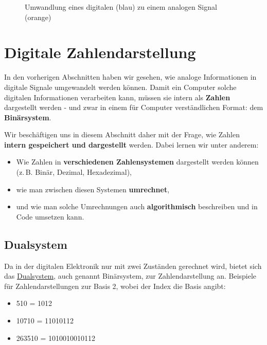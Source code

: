 \documentclass[
  letterpaper,
  DIV=11,
  numbers=noendperiod]{scrreprt}
\providecommand{\tightlist}{%
  \setlength{\itemsep}{0pt}\setlength{\parskip}{0pt}}\usepackage{longtable,booktabs,array}
\begin{document}
\begin{figure}


\caption{\label{fig-transform_digital_analog}Umwandlung eines digitalen
(blau) zu einem analogen Signal (orange)}

\end{figure}%

\section{Digitale Zahlendarstellung}\label{digitale-zahlendarstellung}

In den vorherigen Abschnitten haben wir gesehen, wie analoge
Informationen in digitale Signale umgewandelt werden können. Damit ein
Computer solche digitalen Informationen verarbeiten kann, müssen sie
intern als \textbf{Zahlen} dargestellt werden - und zwar in einem für
Computer verständlichen Format: dem \textbf{Binärsystem}.

Wir beschäftigen uns in diesem Abschnitt daher mit der Frage, wie Zahlen
\textbf{intern gespeichert und dargestellt} werden. Dabei lernen wir
unter anderem:

\begin{itemize}
\tightlist
\item
  Wie Zahlen in \textbf{verschiedenen Zahlensystemen} dargestellt werden
  können (z.\,B. Binär, Dezimal, Hexadezimal),
\item
  wie man zwischen diesen Systemen \textbf{umrechnet},
\item
  und wie man solche Umrechnungen auch \textbf{algorithmisch}
  beschreiben und in Code umsetzen kann.
\end{itemize}

\subsection{Dualsystem}\label{dualsystem}

Da in der digitalen Elektronik nur mit zwei Zuständen gerechnet wird,
bietet sich das
\href{https://de.wikipedia.org/wiki/Dualsystem}{Dualsystem}, auch
genannt Binärsystem, zur Zahlendarstellung an. Beispiele für
Zahlendarstellungen zur Basis 2, wobei der Index die Basis angibt:

\begin{itemize}
\tightlist
\item
  510 = 1012
\item
  10710 = 11010112
\item
  263510 = 1010010010112
\end{itemize}
\end{document}
